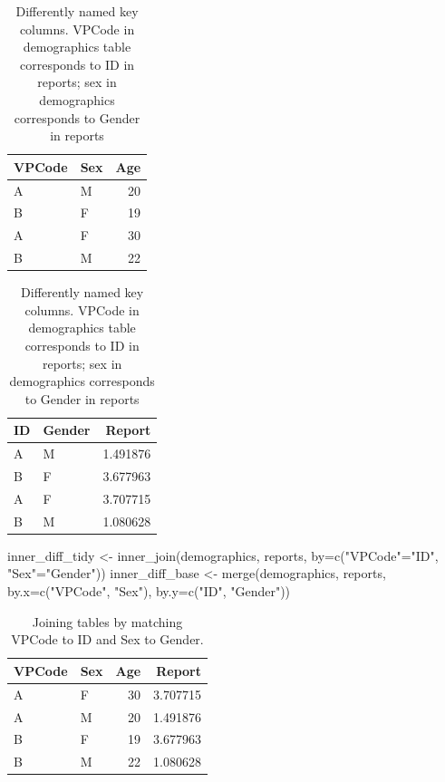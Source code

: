 \documentclass[
]{book}
\newenvironment{Shaded}{\begin{snugshade}}{\end{snugshade}}
\newcommand{\AttributeTok}[1]{\textcolor[rgb]{0.77,0.63,0.00}{#1}}
\newcommand{\FunctionTok}[1]{\textcolor[rgb]{0.00,0.00,0.00}{#1}}
\newcommand{\NormalTok}[1]{#1}
\newcommand{\OtherTok}[1]{\textcolor[rgb]{0.56,0.35,0.01}{#1}}
\newcommand{\StringTok}[1]{\textcolor[rgb]{0.31,0.60,0.02}{#1}}
\begin{document}
\begin{table}
\caption{\label{tab:unnamed-chunk-193}Differently named key columns. VPCode in demographics table corresponds to ID in reports; sex in demographics corresponds to Gender in reports}

\centering
\begin{tabular}[t]{l|l|r}
\hline
VPCode & Sex & Age\\
\hline
A & M & 20\\
\hline
B & F & 19\\
\hline
A & F & 30\\
\hline
B & M & 22\\
\hline
\end{tabular}
\centering
\begin{tabular}[t]{l|l|r}
\hline
ID & Gender & Report\\
\hline
A & M & 1.491876\\
\hline
B & F & 3.677963\\
\hline
A & F & 3.707715\\
\hline
B & M & 1.080628\\
\hline
\end{tabular}
\end{table}

\begin{Shaded}
\begin{Highlighting}[]
\NormalTok{inner\_diff\_tidy }\OtherTok{\textless{}{-}} \FunctionTok{inner\_join}\NormalTok{(demographics, reports, }\AttributeTok{by=}\FunctionTok{c}\NormalTok{(}\StringTok{"VPCode"}\OtherTok{=}\StringTok{"ID"}\NormalTok{, }\StringTok{"Sex"}\OtherTok{=}\StringTok{"Gender"}\NormalTok{))}
\NormalTok{inner\_diff\_base }\OtherTok{\textless{}{-}} \FunctionTok{merge}\NormalTok{(demographics, reports, }\AttributeTok{by.x=}\FunctionTok{c}\NormalTok{(}\StringTok{"VPCode"}\NormalTok{, }\StringTok{"Sex"}\NormalTok{), }\AttributeTok{by.y=}\FunctionTok{c}\NormalTok{(}\StringTok{"ID"}\NormalTok{, }\StringTok{"Gender"}\NormalTok{))}
\end{Highlighting}
\end{Shaded}

\begin{table}

\caption{\label{tab:unnamed-chunk-195}Joining tables by matching VPCode to ID and Sex to Gender.}
\centering
\begin{tabular}[t]{l|l|r|r}
\hline
VPCode & Sex & Age & Report\\
\hline
A & F & 30 & 3.707715\\
\hline
A & M & 20 & 1.491876\\
\hline
B & F & 19 & 3.677963\\
\hline
B & M & 22 & 1.080628\\
\hline
\end{tabular}
\end{table}
\end{document}
